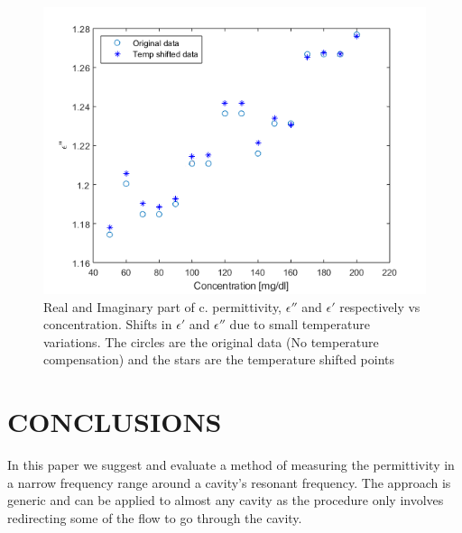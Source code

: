 \documentclass[10pt,final,conference,a4paper,twocolumn]{IEEEtran_AntennEMB_GigaHertz2016}
\begin{document}
\begin{figure}[t]
	\centering
	\includegraphics[width=1.0\columnwidth]{pumpgluzoomEIM.png}
	\caption{Real and Imaginary part of c. permittivity, $\epsilon''$ and $\epsilon'$ respectively vs concentration. Shifts in $\epsilon'$ and $\epsilon''$ due to small temperature variations. The circles are the original data (No temperature compensation) and the stars are the temperature shifted points}
	\label{fig:eim}
\end{figure}









\section{CONCLUSIONS}
In this paper we suggest and evaluate a method of measuring the permittivity in a narrow frequency range around a cavity's resonant frequency. The approach is generic and can be applied to almost any cavity as the procedure only involves redirecting some of the flow to go through the cavity.
\end{document}
